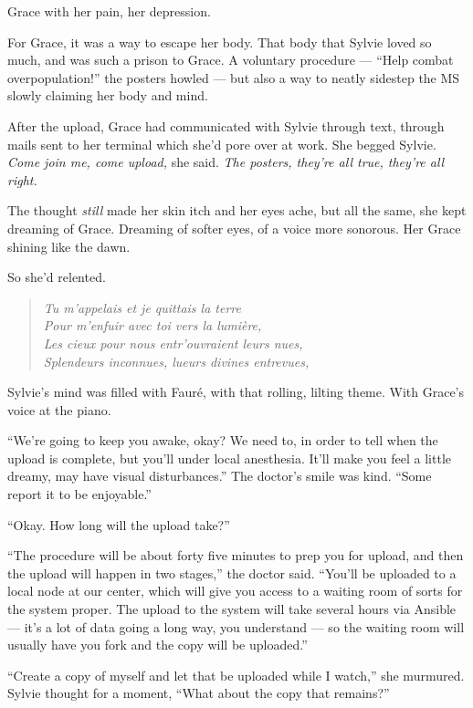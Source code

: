 Grace with her pain, her depression.

For Grace, it was a way to escape her body. That body that Sylvie loved so much, and was such a prison to Grace. A voluntary procedure --- ``Help combat overpopulation!'' the posters howled --- but also a way to neatly sidestep the MS slowly claiming her body and mind.

After the upload, Grace had communicated with Sylvie through text, through mails sent to her terminal which she'd pore over at work. She begged Sylvie. \emph{Come join me, come upload,} she said. \emph{The posters, they're all true, they're all right.}

The thought \emph{still} made her skin itch and her eyes ache, but all the same, she kept dreaming of Grace. Dreaming of softer eyes, of a voice more sonorous. Her Grace shining like the dawn.

So she'd relented.

\begin{quote}
\emph{Tu m'appelais et je quittais la terre\\
Pour m'enfuir avec toi vers la lumière,\\
Les cieux pour nous entr'ouvraient leurs nues,\\
Splendeurs inconnues, lueurs divines entrevues,}
\end{quote}

\noindent Sylvie's mind was filled with Fauré, with that rolling, lilting theme. With Grace's voice at the piano.

``We're going to keep you awake, okay? We need to, in order to tell when the upload is complete, but you'll under local anesthesia. It'll make you feel a little dreamy, may have visual disturbances.'' The doctor's smile was kind. ``Some report it to be enjoyable.''

``Okay. How long will the upload take?''

``The procedure will be about forty five minutes to prep you for upload, and then the upload will happen in two stages,'' the doctor said. ``You'll be uploaded to a local node at our center, which will give you access to a waiting room of sorts for the system proper. The upload to the system will take several hours via Ansible --- it's a lot of data going a long way, you understand --- so the waiting room will usually have you fork and the copy will be uploaded.''

``Create a copy of myself and let that be uploaded while I watch,'' she murmured. Sylvie thought for a moment, ``What about the copy that remains?''

